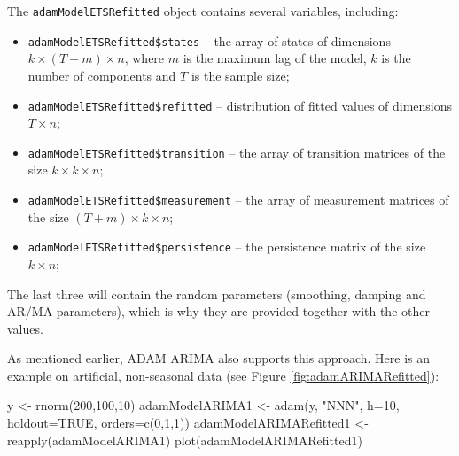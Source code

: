 \documentclass[
]{book}
\newenvironment{Shaded}{\begin{snugshade}}{\end{snugshade}}
\newcommand{\AttributeTok}[1]{\textcolor[rgb]{0.77,0.63,0.00}{#1}}
\newcommand{\ConstantTok}[1]{\textcolor[rgb]{0.00,0.00,0.00}{#1}}
\newcommand{\DecValTok}[1]{\textcolor[rgb]{0.00,0.00,0.81}{#1}}
\newcommand{\FunctionTok}[1]{\textcolor[rgb]{0.00,0.00,0.00}{#1}}
\newcommand{\NormalTok}[1]{#1}
\newcommand{\OtherTok}[1]{\textcolor[rgb]{0.56,0.35,0.01}{#1}}
\newcommand{\StringTok}[1]{\textcolor[rgb]{0.31,0.60,0.02}{#1}}
\providecommand{\tightlist}{%
  \setlength{\itemsep}{0pt}\setlength{\parskip}{0pt}}
\theoremstyle{definition}
\theoremstyle{definition}
\theoremstyle{definition}
\theoremstyle{definition}
\theoremstyle{remark}
\begin{document}
The \texttt{adamModelETSRefitted} object contains several variables, including:

\begin{itemize}
\tightlist
\item
  \texttt{adamModelETSRefitted\$states} -- the array of states of dimensions \(k \times (T+m) \times n\), where \(m\) is the maximum lag of the model, \(k\) is the number of components and \(T\) is the sample size;
\item
  \texttt{adamModelETSRefitted\$refitted} -- distribution of fitted values of dimensions \(T \times n\);
\item
  \texttt{adamModelETSRefitted\$transition} -- the array of transition matrices of the size \(k \times k \times n\);
\item
  \texttt{adamModelETSRefitted\$measurement} -- the array of measurement matrices of the size \((T+m) \times k \times n\);
\item
  \texttt{adamModelETSRefitted\$persistence} -- the persistence matrix of the size \(k \times n\);
\end{itemize}

The last three will contain the random parameters (smoothing, damping and AR/MA parameters), which is why they are provided together with the other values.

As mentioned earlier, ADAM ARIMA also supports this approach. Here is an example on artificial, non-seasonal data (see Figure \ref{fig:adamARIMARefitted}):

\begin{Shaded}
\begin{Highlighting}[]
\NormalTok{y }\OtherTok{\textless{}{-}} \FunctionTok{rnorm}\NormalTok{(}\DecValTok{200}\NormalTok{,}\DecValTok{100}\NormalTok{,}\DecValTok{10}\NormalTok{)}
\NormalTok{adamModelARIMA1 }\OtherTok{\textless{}{-}} \FunctionTok{adam}\NormalTok{(y, }\StringTok{"NNN"}\NormalTok{, }\AttributeTok{h=}\DecValTok{10}\NormalTok{, }\AttributeTok{holdout=}\ConstantTok{TRUE}\NormalTok{,}
                        \AttributeTok{orders=}\FunctionTok{c}\NormalTok{(}\DecValTok{0}\NormalTok{,}\DecValTok{1}\NormalTok{,}\DecValTok{1}\NormalTok{))}
\NormalTok{adamModelARIMARefitted1 }\OtherTok{\textless{}{-}} \FunctionTok{reapply}\NormalTok{(adamModelARIMA1)}
\FunctionTok{plot}\NormalTok{(adamModelARIMARefitted1)}
\end{Highlighting}
\end{Shaded}
\end{document}
